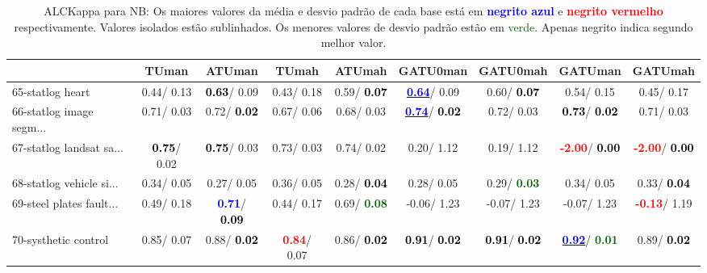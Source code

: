 \begin{table}[h]
\caption{ALCKappa para NB: Os maiores valores da média e desvio padrão de cada base está em \textcolor{blue}{\textbf{negrito azul}} e \textcolor{red}{\textbf{negrito vermelho}} respectivamente. Valores isolados estão sublinhados. Os menores valores de desvio padrão estão em \textcolor{darkgreen}{verde}. Apenas negrito indica segundo melhor valor.}
\begin{center}\begin{tabular}{lc|c|c|c|c|c|c|c}
 & TUman & \textbf{ATUman} & TUmah & \textbf{ATUmah} & GATU0man & GATU0mah & GATUman & GATUmah\\ \hline 65-statlog heart &   0.44/  0.13 & \textcolor{black}{\textbf{  0.63}}/  0.09 &   0.43/  0.18 &   0.59/\textcolor{black}{\textbf{  0.07}} & \underline{\textcolor{blue}{\textbf{  0.64}}}/  0.09 &   0.60/\textcolor{black}{\textbf{  0.07}} &   0.54/  0.15 &   0.45/  0.17 \\
66-statlog image segm... &   0.71/  0.03 &   0.72/\textcolor{black}{\textbf{  0.02}} &   0.67/  0.06 &   0.68/  0.03 & \underline{\textcolor{blue}{\textbf{  0.74}}}/\textcolor{black}{\textbf{  0.02}} &   0.72/  0.03 & \textcolor{black}{\textbf{  0.73}}/\textcolor{black}{\textbf{  0.02}} &   0.71/  0.03 \\
67-statlog landsat sa... & \textcolor{black}{\textbf{  0.75}}/  0.02 & \textcolor{black}{\textbf{  0.75}}/  0.03 &   0.73/  0.03 &   0.74/  0.02 &   0.20/  1.12 &   0.19/  1.12 & \textcolor{red}{\textbf{ -2.00}}/\textcolor{black}{\textbf{  0.00}} & \textcolor{red}{\textbf{ -2.00}}/\textcolor{black}{\textbf{  0.00}} \\
68-statlog vehicle si... &   0.34/  0.05 &   0.27/  0.05 &   0.36/  0.05 &   0.28/\textcolor{black}{\textbf{  0.04}} &   0.28/  0.05 &   0.29/\textcolor{darkgreen}{\textbf{  0.03}} &   0.34/  0.05 &   0.33/\textcolor{black}{\textbf{  0.04}} \\
69-steel plates fault... &   0.49/  0.18 & \textcolor{blue}{\textbf{  0.71}}/\textcolor{black}{\textbf{  0.09}} &   0.44/  0.17 &   0.69/\textcolor{darkgreen}{\textbf{  0.08}} &  -0.06/  1.23 &  -0.07/  1.23 &  -0.07/  1.23 & \textcolor{red}{\textbf{ -0.13}}/  1.19 \\
70-systhetic control &   0.85/  0.07 &   0.88/\textcolor{black}{\textbf{  0.02}} & \textcolor{red}{\textbf{  0.84}}/  0.07 &   0.86/\textcolor{black}{\textbf{  0.02}} & \textcolor{black}{\textbf{  0.91}}/\textcolor{black}{\textbf{  0.02}} & \textcolor{black}{\textbf{  0.91}}/\textcolor{black}{\textbf{  0.02}} & \underline{\textcolor{blue}{\textbf{  0.92}}}/\textcolor{darkgreen}{\textbf{  0.01}} &   0.89/\textcolor{black}{\textbf{  0.02}} \\

\end{tabular}
\end{center}
\end{table}
